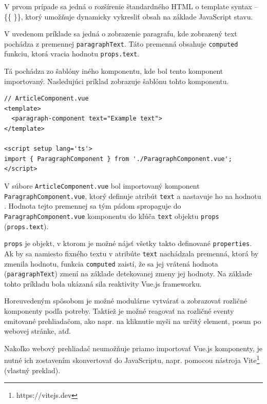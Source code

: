 V prvom prípade sa jedná o rozšírenie štandardného HTML o template syntax -- \{\{ \}\}, ktorý umožňuje dynamicky vykresliť obsah na základe JavaScript stavu.

V uvedenom príklade sa jedná o zobrazenie paragrafu, kde zobrazený text pochádza z premennej \texttt{paragraphText}. Táto premenná obsahuje \texttt{computed} funkciu, ktorá vracia hodnotu \texttt{props.text}.

Tá pochádza zo šablóny iného komponentu, kde bol tento komponent importovaný. Nasledujúci príklad zobrazuje šablónu tohto komponentu.

\clearpage

\begin{minipage}[]{\linewidth}
\begin{verbatim}
// ArticleComponent.vue
<template>
  <paragraph-component text="Example text">
</template>

<script setup lang='ts'>
import { ParagraphComponent } from './ParagraphComponent.vue';
</script>
\end{verbatim}
\end{minipage}

V súbore \texttt{ArticleComponent.vue} bol importovaný komponent \newline \texttt{ParagraphComponent.vue}, ktorý definuje atribút \texttt{text} a nastavuje ho na hodnotu . Hodnota tejto premennej sa tým pádom spropaguje do
\texttt{ParagraphComponent.vue} komponentu do kľúča \texttt{text} objektu \texttt{props} (\texttt{props.text}).

\texttt{props} je objekt, v ktorom je možné nájsť všetky takto definované \texttt{properties}. Ak by sa namiesto fixného textu v atribúte \texttt{text} nachádzala premenná, ktorá by zmenila hodnotu, funkcia \texttt{computed} zaistí, že sa jej vrátená hodnota (\texttt{paragraphText}) zmení na základe detekovanej zmeny jej hodnoty.
Na základe tohto príkladu bola ukázaná sila reaktivity Vue.js frameworku.

Horeuvedeným spôsobom je možné modulárne vytvárať a zobrazovať rozličné komponenty podľa potreby. Taktiež je možné reagovať na rozličné eventy emitované prehliadačom, ako napr. na kliknutie myši na určitý element, posun po webovej stránke, atď.

Nakoľko webový prehliadač neumožňuje priamo importovať Vue.js komponenty, je nutné ich zostavením skonvertovať do JavaScriptu, napr. pomocou nástroja Vite\footnote{https://vitejs.dev} \cite{vuejs_introduction} (vlastný preklad).

